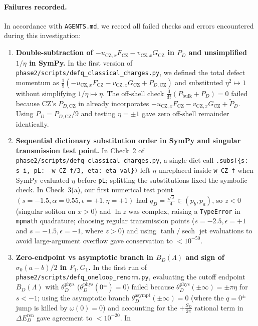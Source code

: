 \documentclass[11pt,a4paper]{article}
\newcommand{\dd}{\mathrm{d}}
\newcommand{\sclass}{\texttt{phase2/\allowbreak scripts/\allowbreak defq\_\allowbreak classical\_\allowbreak charges.py}}
\newcommand{\sren}{\texttt{phase2/\allowbreak scripts/\allowbreak defq\_\allowbreak oneloop\_\allowbreak renorm.py}}
\theoremstyle{remark}
\begin{document}
\paragraph{Failures recorded.}
In accordance with \texttt{AGENTS.md}, we record all failed checks and errors
encountered during this investigation:
\begin{enumerate}
\item \textbf{Double-subtraction of $-u_{\mathrm{CZ},x}F_{\mathrm{CZ}} - v_{\mathrm{CZ},x}G_{\mathrm{CZ}}$ in $P_D$ and unsimplified $1/\eta$ in SymPy.}
In the first version of \sclass, we defined the
total defect momentum as $\frac{1}{9}(-u_{\mathrm{CZ},x}F_{\mathrm{CZ}} - v_{\mathrm{CZ},x}G_{\mathrm{CZ}} + P_{D,\mathrm{CZ}})$
and substituted $\eta^2 \mapsto 1$ without simplifying $1/\eta \mapsto \eta$.
The off-shell check $\frac{\dd}{\dd t}(P_{\mathrm{bulk}}+P_D)=0$ failed because
CZ's $P_{D,\mathrm{CZ}}$ in \cite[(3.49)]{CZ} already incorporates
$-u_{\mathrm{CZ},x}F_{\mathrm{CZ}} - v_{\mathrm{CZ},x}G_{\mathrm{CZ}} + \tilde{P}_D$.
Using $P_D = P_{D,\mathrm{CZ}}/9$ and testing $\eta=\pm 1$ gave zero off-shell
remainder identically.
\item \textbf{Sequential dictionary substitution order in SymPy and singular transmission test point.}
In Check~2 of \sclass, a single dict call
\texttt{.subs(\{s: s\_i, pL: -w\_CZ\_f/3, eta: eta\_val\})} left $\eta$ unreplaced
inside \texttt{w\_CZ\_f} when SymPy evaluated $\eta$ before \texttt{pL};
splitting the substitutions fixed the symbolic check. In Check~3(a), our first
numerical test point $(s=-1.5,\alpha=0.55,\epsilon=+1,\eta=+1)$ had
$q_D = \frac{\sqrt{3}}{4} \in (p_b,p_a)$, so $z < 0$ (singular soliton on $x>0$)
and $\ln z$ was complex, raising a \texttt{TypeError} in \texttt{mpmath}
quadrature; choosing regular transmission points ($s=-2.5,\epsilon=+1$ and
$s=-1.5,\epsilon=-1$, where $z>0$) and using $\tanh/\operatorname{sech}$ jet
evaluations to avoid large-argument overflow gave conservation to $<10^{-50}$.
\item \textbf{Zero-endpoint vs asymptotic branch in $B_D(\Lambda)$ and sign of $\sigma_0(a-b)/2$ in $F_1,G_1$.}
In the first run of \sren, evaluating the cutoff
endpoint $B_D(\Lambda)$ with $\theta_D^{\mathrm{phys}}$ ($\theta_D^{\mathrm{phys}}(0^\pm)=0$)
failed because $\theta_D^{\mathrm{phys}}(\pm\infty) = \pm\pi\eta$ for $s<-1$;
using the asymptotic branch $\theta_D^{\mathrm{asympt}}(\pm\infty)=0$ (where the
$q=0^\pm$ jump is killed by $\omega(0)=0$) and accounting for the $+\frac{S_D}{2\pi}$
rational term in $\Delta E_D^{\mathrm{ren}}$ gave agreement to $<10^{-20}$. In

\end{enumerate}
\end{document}
